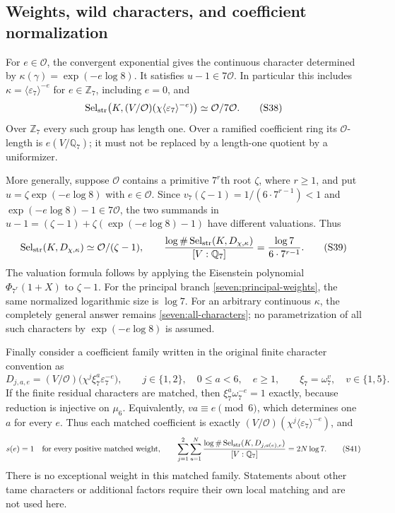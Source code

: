 \documentclass[11pt]{article}
\begin{document}
\subsection{Weights, wild characters, and coefficient normalization}
\label{seven:weights}

For $e\in\mathcal O$, the convergent exponential gives the continuous
character determined by
$\kappa(\gamma)=\exp(-e\log8)$.
It satisfies $u-1\in7\mathcal O$. In particular this includes
$\kappa=\langle\varepsilon_7\rangle^{-e}$ for $e\in\mathbb Z_7$, including
$e=0$, and
\[
 \operatorname{Sel}_{\rm str}
   \bigl(K,(V/\mathcal O)(\chi\langle\varepsilon_7\rangle^{-e})\bigr)
 \simeq\mathcal O/7\mathcal O.
 \tag{S38}\label{seven:principal-weights}
\]
Over $\mathbb Z_7$ every such group has length one.
Over a ramified coefficient ring its $\mathcal O$-length is
$e(V/\mathbb Q_7)$; it must not be replaced by a length-one quotient by
a uniformizer.

More generally, suppose $\mathcal O$ contains a primitive $7^r$th root
$\zeta$, where $r\ge1$, and put
$u=\zeta\exp(-e\log8)$ with $e\in\mathcal O$.
Since
$v_7(\zeta-1)=1/(6\cdot7^{r-1})<1$
and $\exp(-e\log8)-1\in7\mathcal O$, the two summands in
$u-1=(\zeta-1)+\zeta(\exp(-e\log8)-1)$ have different valuations.
Thus
\[
 \operatorname{Sel}_{\rm str}(K,D_{\chi,\kappa})
 \simeq\mathcal O/(\zeta-1),\qquad
 \frac{\log\#\operatorname{Sel}_{\rm str}(K,D_{\chi,\kappa})}
      {[V:\mathbb Q_7]}
 =\frac{\log7}{6\cdot7^{r-1}}.
 \tag{S39}\label{seven:wild-cost}
\]
The valuation formula follows by applying the Eisenstein polynomial
$\Phi_{7^r}(1+X)$ to $\zeta-1$.
For the principal branch \eqref{seven:principal-weights}, the same
normalized logarithmic size is $\log7$.
For an arbitrary continuous $\kappa$, the completely general answer
remains \eqref{seven:all-characters}; no parametrization of all such
characters by $\exp(-e\log8)$ is assumed.

Finally consider a coefficient family written in the original finite
character convention as
\[
 D_{j,a,e}=(V/\mathcal O)
    \bigl(\chi^j\xi_7^a\varepsilon_7^{-e}\bigr),\qquad
 j\in\{1,2\},\quad0\le a<6,\quad e\ge1,
 \qquad \xi_7=\omega_7^v,\quad v\in\{1,5\}.
 \tag{S40}\label{seven:matched-coefficients}
\]
If the finite residual characters are matched, then
$\xi_7^a\omega_7^{-e}=1$ exactly, because reduction is injective on
$\mu_6$. Equivalently, $va\equiv e\pmod6$, which determines one $a$
for every $e$. Thus each matched coefficient is exactly
$(V/\mathcal O)(\chi^j\langle\varepsilon_7\rangle^{-e})$, and
\[
 s(e)=1\quad\hbox{for every positive matched weight},\qquad
 \sum_{j=1}^{2}\sum_{e=1}^{N}
 \frac{\log\#\operatorname{Sel}_{\rm str}(K,D_{j,a(e),e})}
      {[V:\mathbb Q_7]}
 =2N\log7.
 \tag{S41}\label{seven:matched-cost}
\]
There is no exceptional weight in this matched family. Statements about
other tame characters or additional factors require their own local
matching and are not used here.
\end{document}
